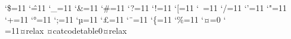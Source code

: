 {%

}%

\def\LD@Yomigana#1#2{%
	\directlua0{Furigana,Quirks_Level=LD_Yomigana_Compute("#1","#2")}
	\xdef\LD@Yomigana@GlobalFurigana{%
		\directlua0{tex.print(unicode.utf8.sub(Furigana,1,-2))}%
	}%
	\xdef\LD@Yomigana@Quirks@G@Level{%
		\directlua0{tex.print(Quirks_Level)}%
	}%
%
}%
\relax
{}\relax
\catcode`\$=11\relax%
\catcode`\^=11\relax%
\catcode`\_=11\relax%
\catcode`\&=11\relax%
\catcode`\#=11\relax%
\catcode`?=11\relax
\catcode`!=11\relax
\catcode`[=11\relax
\catcode`~=11\relax
\catcode`/=11\relax
\catcode`'=11\relax
\catcode`"=11\relax
\catcode`+=11\relax
\catcode`°=11\relax
\catcode`;=11\relax
\catcode`µ=11\relax
\catcode`£=11\relax
\catcode`¨=11\relax
\catcode`\{=11\relax
\catcode`\%=11\relax
\catcode`¤=0\relax
\catcode`\\=11¤relax
¤catcodetable0¤relax
	
\def\LD@XML@Parser#1{%
	\LD@Time@Benchmark{Parsing #1...}%
	\xdef\LD@XML@SavedTimeStart{\the\LD@Time@Moment}%
	\catcodetable1\relax
		\catcode`>=12\relax
		\def\>{%
			¤catcode`¤]=11¤relax
		}%
		\catcode`]=0\relax
		\catcode60=0\relax
		\relax
	\catcodetable0\relax
	\LD@Time@Moment=\LD@XML@SavedTimeStart\relax	
	\LD@Time@Benchmark [silent]\LD@Temp
	\immediate\write16{Parsing of #1 done in \LD@Temp.}%
}%

\endinput